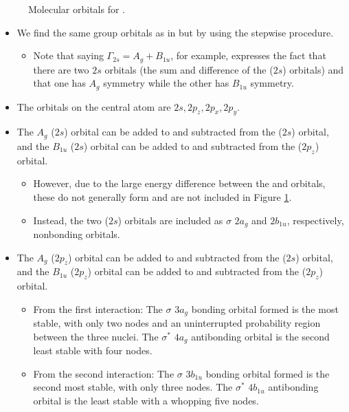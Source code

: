 \documentclass[../notes.tex]{subfiles}
\begin{document}
\begin{itemize}
\begin{figure}[h!]
        \caption{Molecular orbitals for .}
        \label{fig:molecularOrbitals-CO2}
    \end{figure}
    \begin{itemize}
        \item We find the same group orbitals as in  but by using the stepwise procedure.
        \begin{itemize}
            \item Note that saying $\Gamma_{2s}=A_g+B_{1u}$, for example, expresses the fact that there are two $2s$ orbitals (the sum and difference of the ($2s$) orbitals) and that one has $A_g$ symmetry while the other has $B_{1u}$ symmetry.
        \end{itemize}
        \item The orbitals on the central atom are $2s,2p_z,2p_x,2p_y$.
        \item The $A_g$ ($2s$) orbital can be added to and subtracted from the ($2s$) orbital, and the $B_{1u}$ ($2s$) orbital can be added to and subtracted from the ($2p_z$) orbital.
        \begin{itemize}
            \item However, due to the large energy difference between the  and  orbitals, these do not generally form and are not included in Figure \ref{fig:molecularOrbitals-CO2}.
            \item Instead, the two ($2s$) orbitals are included as $\sigma$ $2a_g$ and $2b_{1u}$, respectively, nonbonding orbitals.
        \end{itemize}
        \item The $A_g$ ($2p_z$) orbital can be added to and subtracted from the ($2s$) orbital, and the $B_{1u}$ ($2p_z$) orbital can be added to and subtracted from the ($2p_z$) orbital.
        \begin{itemize}
            \item From the first interaction: The $\sigma$ $3a_g$ bonding orbital formed is the most stable, with only two nodes and an uninterrupted probability region between the three nuclei. The $\sigma^*$ $4a_g$ antibonding orbital is the second least stable with four nodes.
            \item From the second interaction: The $\sigma$ $3b_{1u}$ bonding orbital formed is the second most stable, with only three nodes. The $\sigma^*$ $4b_{1u}$ antibonding orbital is the least stable with a whopping five nodes.
        \end{itemize}

\end{itemize}
\end{itemize}
\end{document}
